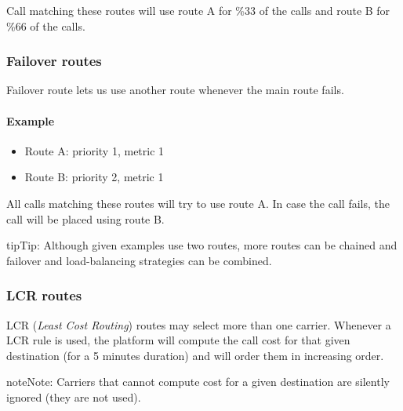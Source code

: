 \documentclass[letterpaper,10pt,english]{sphinxmanual}
\begin{document}
Call matching these routes will use route A for \%33 of the calls and route B for
\%66 of the calls.


\subsubsection{Failover routes}
\label{administration_portal/brand/routing/outgoing_routings:failover-routes}
Failover route lets us use another route whenever the main route fails.
\paragraph{Example}
\begin{itemize}
\item {} 
Route A: priority 1, metric 1

\item {} 
Route B: priority 2, metric 1

\end{itemize}

All calls matching these routes will try to use route A. In case the call fails,
the call will be placed using route B.

\begin{notice}{tip}{Tip:}
Although given examples use two routes, more routes can be chained and
failover and load-balancing strategies can be combined.
\end{notice}


\subsubsection{LCR routes}
\label{administration_portal/brand/routing/outgoing_routings:lcr-routes}
LCR (\emph{Least Cost Routing}) routes may select more than one carrier. Whenever a LCR rule is used, the platform will compute the call cost for that
given destination (for a 5 minutes duration) and will order them in increasing order.

\begin{notice}{note}{Note:}
Carriers that cannot compute cost for a given destination are silently ignored (they are not used).
\end{notice}
\end{document}
